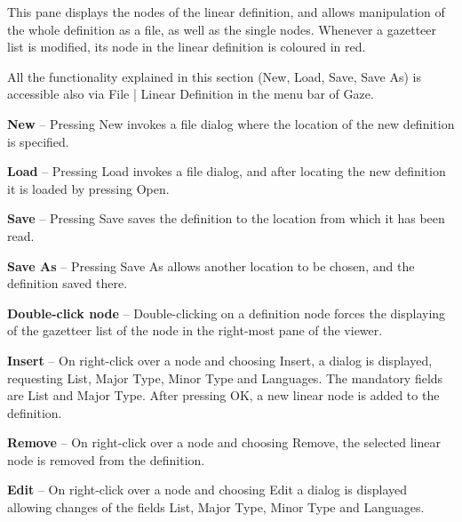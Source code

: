 This pane displays the nodes of the linear definition, and allows manipulation
of the whole definition as a file, as well as the single nodes. Whenever a
gazetteer list is modified, its node in the linear definition is coloured in red.


All the functionality explained in this section (New, Load, Save, Save As) is
accessible also via File | Linear Definition in the menu bar of Gaze.

\textbf{New} -- Pressing New invokes a file dialog where the location of the new
definition is specified.

\textbf{Load} -- Pressing Load invokes a file dialog, and after locating the new
definition it is loaded by pressing Open.

\textbf{Save} -- Pressing Save saves the definition to the location from which it has
been read.
	
\textbf{Save As} -- Pressing Save As allows another location to be chosen, and
the definition saved there.
		

\textbf{Double-click node} -- Double-clicking on a definition node forces
the displaying of the gazetteer list of the node in the right-most pane of the
viewer.

\textbf{Insert} -- On right-click over a node and choosing Insert, a dialog is
displayed, requesting List, Major Type, Minor Type and Languages. The mandatory
fields are List and Major Type. After pressing OK, a new linear node is added to
the definition.

\textbf{Remove} -- On right-click over a node and choosing Remove, the selected
linear node is removed from the definition.

\textbf{Edit} -- On right-click over a node and choosing Edit a dialog is
displayed allowing changes of the fields List, Major Type, Minor Type and
Languages. 



